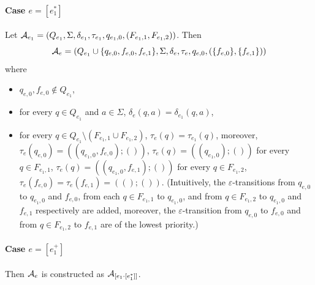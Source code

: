 
\paragraph{Case $e = [e_1^{\ast}]$} 
Let $\mathcal{A}_{e_1} = (Q_{e_1}, \Sigma, \delta_{e_1}, \tau_{e_1}, q_{e_1,0}, (F_{e_1,1}, F_{e_1,2}))$. Then
\[ \mathcal{A}_e = (Q_{e_1} \cup \{q_{e,0}, f_{e,0}, f_{e,1}\}, \Sigma, \delta_e, \tau_e, q_{e,0}, (\{f_{e,0}\}, \{f_{e,1}\}))\] where 
		\begin{itemize}
			\item $q_{e,0}, f_{e,0} \not \in Q_{e_1}$,
			
			\item for every $q \in Q_{e_1}$ and $a \in \Sigma$, $\delta_e(q, a) = \delta_{e_1}(q, a)$, 
			
			\item for every $q \in Q_{e_1} \setminus (F_{e_1,1} \cup F_{e_1,2})$,  $\tau_e(q) = \tau_{e_1}(q)$, moreover, $\tau_e(q_{e,0}) = ((q_{e_1,0},f_{e,0}); ())$,  $\tau_e(q) = ((q_{e_1,0});())$ for every $q \in F_{e_1,1}$, $\tau_e(q) = ((q_{e_1,0}, f_{e,1});())$ for every $q \in F_{e_1,2}$, $\tau_e(f_{e,0}) =\tau_e(f_{e,1}) = (();())$. (Intuitively, the $\varepsilon$-transitions from $q_{e,0}$ to $q_{e_1,0}$ and $f_{e,0}$, from each $q \in F_{e_1,1}$ to $q_{e_1,0}$, and from $q \in F_{e_1,2}$ to $q_{e_1,0}$ and $f_{e,1}$ respectively are added, moreover, the $\varepsilon$-transition from $q_{e,0}$ to $f_{e,0}$ and from $q \in F_{e_1,2}$ to $f_{e,1}$ are of the lowest priority.)
		\end{itemize}

\paragraph{Case $e = [e_1^{+}]$} Then $\mathcal{A}_e$ is constructed as $\mathcal{A}_{[e_1 \cdot [e^\ast_1]]}$.
		
